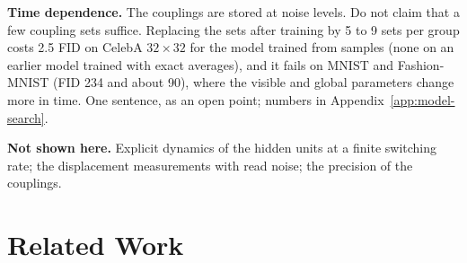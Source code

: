 \begin{plan}
  \item \textbf{Time dependence.} The couplings are stored at \nSlices{} noise
        levels. Do not claim that a few coupling sets suffice. Replacing the
        \nSlices{} sets after training by 5 to 9 sets per group costs 2.5 FID
        on CelebA $32\times32$ for the model trained from samples (none on an
        earlier model trained with exact averages), and it fails on MNIST and
        Fashion-MNIST (FID 234 and about 90), where the visible and global
        parameters change more in time. One sentence, as an open point;
        numbers in Appendix~\ref{app:model-search}.
  \item \textbf{Not shown here.} Explicit dynamics of the hidden units at a
        finite switching rate; the displacement measurements with read noise;
        the precision of the couplings. 
\end{plan}

\section{Related Work}
\label{sec:related}

